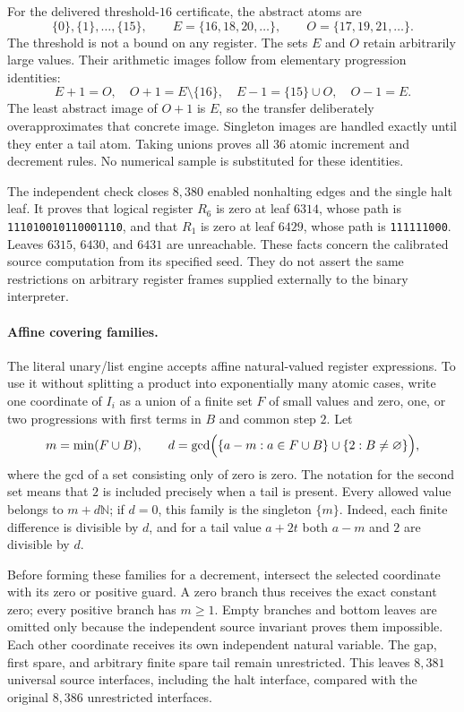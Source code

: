For the delivered threshold-$16$ certificate, the abstract atoms are
\[
 \{0\},\{1\},\ldots,\{15\},\qquad
 E=\{16,18,20,\ldots\},\qquad
 O=\{17,19,21,\ldots\}.
\]
The threshold is not a bound on any register.  The sets $E$ and $O$ retain
arbitrarily large values.  Their arithmetic images follow from elementary
progression identities:
\[
 E+1=O,\quad O+1=E\setminus\{16\},\quad
 E-1=\{15\}\cup O,\quad O-1=E.
\]
The least abstract image of $O+1$ is $E$, so the transfer deliberately
overapproximates that concrete image.  Singleton images are handled exactly
until they enter a tail atom.  Taking unions proves all $36$ atomic increment
and decrement rules.  No numerical sample is substituted for these identities.

The independent check closes $8{,}380$ enabled nonhalting edges and the single
halt leaf.  It proves that logical register $R_6$ is zero at leaf $6314$, whose
path is \texttt{111010010110001110}, and that $R_1$ is zero at leaf $6429$,
whose path is \texttt{111111000}.  Leaves $6315$, $6430$, and $6431$ are
unreachable.  These facts concern the calibrated source computation from its
specified seed.  They do not assert the same restrictions on arbitrary
register frames supplied externally to the binary interpreter.

\paragraph{Affine covering families.}
The literal unary/list engine accepts affine natural-valued register
expressions.  To use it without splitting a product into exponentially many
atomic cases, write one coordinate of $I_i$ as a union of a finite set $F$ of
small values and zero, one, or two progressions with first terms in $B$ and
common step $2$.  Let
\[
 m=\min(F\cup B),\qquad
 d=\gcd\Bigl(\{a-m:a\in F\cup B\}
       \cup\{2:B\ne\varnothing\}\Bigr),
\]
where the gcd of a set consisting only of zero is zero.  The notation for the
second set means that $2$ is included precisely when a tail is present.
Every allowed value belongs to $m+d\mathbb N$; if $d=0$, this family is the
singleton $\{m\}$.  Indeed, each finite difference is divisible by $d$, and
for a tail value $a+2t$ both $a-m$ and $2$ are divisible by $d$.

Before forming these families for a decrement, intersect the selected
coordinate with its zero or positive guard.  A zero branch thus receives the
exact constant zero; every positive branch has $m\ge1$.  Empty branches and
bottom leaves are omitted only because the independent source invariant
proves them impossible.  Each other coordinate receives its own independent
natural variable.  The gap, first spare, and arbitrary finite spare tail remain
unrestricted.  This leaves $8{,}381$ universal source interfaces, including the
halt interface, compared with the original $8{,}386$ unrestricted interfaces.

